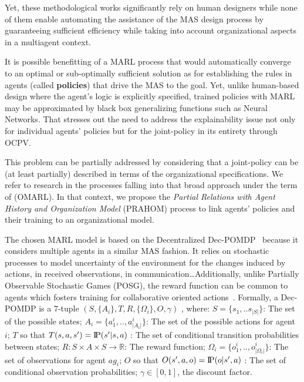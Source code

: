\documentclass[runningheads]{llncs}
\newcommand{\probP}{\text{I\kern-0.15em P}}
\begin{document}
Yet, these methodological works significantly rely on human designers while none of them enable automating the assistance of the MAS design process by guaranteeing sufficient efficiency while taking into account organizational aspects in a multiagent context.

It is possible benefitting of a MARL process that would automatically converge to an optimal or sub-optimally sufficient solution as for establishing the rules in agents (called \textbf{policies}) that drive the MAS to the goal. Yet, unlike human-based design where the agent's logic is explicitly specified, trained policies with MARL may be approximated by black box generalizing functions such as Neural Networks. That stresses out the need to address the explainability issue not only for individual agents' policies but for the joint-policy in its entirety through OCPV.

This problem can be partially addressed by considering that a joint-policy can be (at least partially) described in terms of the organizational specifications.
We refer to research in the processes falling into that broad approach under the term of  (OMARL).
In that context, we propose the \emph{Partial Relations with Agent History and Organization Model} (PRAHOM) process to link agents' policies and their training to an organizational model.

The chosen MARL model is based on the Decentralized Dec-POMDP~\cite{Oliehoek2016} because it considers multiple agents in a similar MAS fashion. It relies on stochastic processes to model uncertainty of the environment for the changes induced by actions, in received observations, in communication\dots Additionally, unlike Partially Observable Stochastic Games (POSG), the reward function can be common to agents which fosters training for collaborative oriented actions~\cite{Beynier2013}. Formally, a Dec-POMDP is a 7-tuple $(S,\{A_i\},T,R,\{\Omega_i\},O,\gamma)$ , where: $S = \{s_1, ..s_{|S|}\}$: The set of the possible states; $A_{i} = \{a_{1}^{i},..,a_{|A_{i}|}^{i}\}$: The set of the possible actions for agent $i$; $T$ so that $T(s,a,s') = \probP{(s'|s,a)}$ : The set of conditional transition probabilities between states; $R: S \times A \times S \rightarrow \mathbb{R}$: The reward function; $\Omega_{i} = \{o_{1}^{i},..,o_{|\Omega_{i}|}^{i}\}$: The set of observations for agent $ag_i$; $O$ so that $O(s',a,o) = \probP{(o|s',a)}$ : The set of conditional observation probabilities; $\gamma \in [0,1]$, the discount factor.
\end{document}
